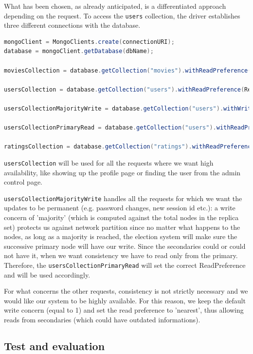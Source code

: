 \documentclass[11pt]{article}
\begin{document}
What has been chosen, as already anticipated, is a differentiated approach depending on the request. To access the \lstinline{users} collection, the driver establishes three different connections with the database.

\begin{lstlisting}[language=Java]
mongoClient = MongoClients.create(connectionURI);
database = mongoClient.getDatabase(dbName);

moviesCollection = database.getCollection("movies").withReadPreference(ReadPreference.nearest());

usersCollection = database.getCollection("users").withReadPreference(ReadPreference.nearest());

usersCollectionMajorityWrite = database.getCollection("users").withWriteConcern(WriteConcern.MAJORITY);

usersCollectionPrimaryRead = database.getCollection("users").withReadPreference(ReadPreference.primary());

ratingsCollection = database.getCollection("ratings").withReadPreference(ReadPreference.nearest());
\end{lstlisting}

\lstinline{usersCollection} will be used for all the requests where we want high availability, like showing up the profile page or finding the user from the admin control page.

\lstinline{usersCollectionMajorityWrite} handles all the requests for which we want the updates to be permanent (e.g. password changes, new session id etc.): a write concern of 'majority' (which is computed against the total nodes in the replica set) protects us against network partition since no matter what happens to the nodes, as long as a majority is reached, the election system will make sure the successive primary node will have our write. Since the secondaries could or could not have it, when we want consistency we have to read only from the primary. Therefore, the \lstinline{usersCollectionPrimaryRead} will set the correct ReadPreference and will be used accordingly.

For what concerns the other requests, consistency is not strictly necessary and we would like our system to be highly available. For this reason, we keep the default write concern (equal to 1) and set the read preference to 'nearest', thus allowing reads from secondaries (which could have outdated informations).

\subsection{Test and evaluation}
\end{document}
